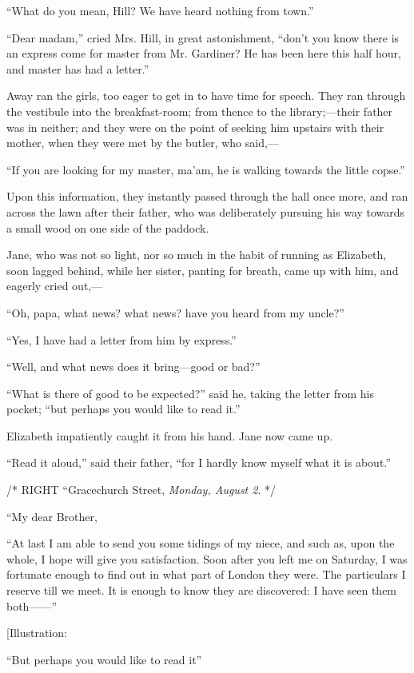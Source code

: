 \documentclass[12pt]{book}
\begin{document}
``What do you mean, Hill? We have heard nothing from town.''

``Dear madam,'' cried Mrs. Hill, in great astonishment, ``don't you know there is an express come for master from Mr. Gardiner? He has been here this half hour, and master has had a letter.''

Away ran the girls, too eager to get in to have time for speech. They ran through the vestibule into the breakfast-room; from thence to the library;---their father was in neither; and they were on the point of seeking him upstairs with their mother, when they were met by the butler, who said,---

``If you are looking for my master, ma'am, he is walking towards the little copse.''

Upon this information, they instantly passed through the hall once more, and ran across the lawn after their father, who was deliberately pursuing his way towards a small wood on one side of the paddock.

Jane, who was not so light, nor so much in the habit of running as Elizabeth, soon lagged behind, while her sister, panting for breath, came up with him, and eagerly cried out,---

``Oh, papa, what news? what news? have you heard from my uncle?''

``Yes, I have had a letter from him by express.''

``Well, and what news does it bring---good or bad?''

``What is there of good to be expected?'' said he, taking the letter from his pocket; ``but perhaps you would like to read it.''

Elizabeth impatiently caught it from his hand. Jane now came up.

``Read it aloud,'' said their father, ``for I hardly know myself what it is about.''

/* RIGHT ``Gracechurch Street, \textit{Monday, August 2}. */

``My dear Brother,

``At last I am able to send you some tidings of my niece, and such as, upon the whole, I hope will give you satisfaction. Soon after you left me on Saturday, I was fortunate enough to find out in what part of London they were. The particulars I reserve till we meet. It is enough to know they are discovered: I have seen them both------''

[Illustration:

``But perhaps you would like to read it''
\end{document}
